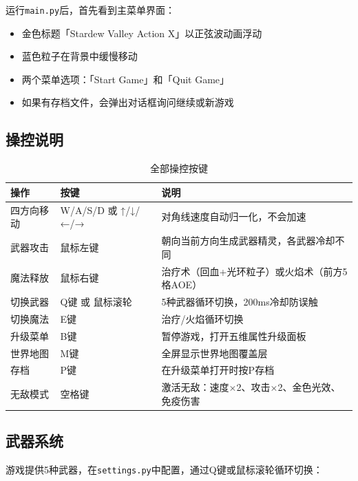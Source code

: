 \documentclass[12pt,a4paper]{ctexart}
\begin{document}
运行\texttt{main.py}后，首先看到主菜单界面：

\begin{itemize}
    \item 金色标题「Stardew Valley Action X」以正弦波动画浮动
    \item 蓝色粒子在背景中缓慢移动
    \item 两个菜单选项：「Start Game」和「Quit Game」
    \item 如果有存档文件，会弹出对话框询问继续或新游戏
\end{itemize}

\subsection{操控说明}

\begin{table}[H]
\centering
\small
\begin{tabularx}{\textwidth}{>{\raggedright\arraybackslash}p{3cm}>{\raggedright\arraybackslash}p{3.5cm}>{\raggedright\arraybackslash}p{6cm}}
\toprule
\textbf{操作} & \textbf{按键} & \textbf{说明} \\
\midrule
四方向移动 & W/A/S/D 或 ↑/↓/←/→ & 对角线速度自动归一化，不会加速 \\
武器攻击 & 鼠标左键 & 朝向当前方向生成武器精灵，各武器冷却不同 \\
魔法释放 & 鼠标右键 & 治疗术（回血+光环粒子）或火焰术（前方5格AOE） \\
切换武器 & Q键 或 鼠标滚轮 & 5种武器循环切换，200ms冷却防误触 \\
切换魔法 & E键 & 治疗/火焰循环切换 \\
升级菜单 & B键 & 暂停游戏，打开五维属性升级面板 \\
世界地图 & M键 & 全屏显示世界地图覆盖层 \\
存档 & P键 & 在升级菜单打开时按P存档 \\
无敌模式 & 空格键 & 激活无敌：速度×2、攻击×2、金色光效、免疫伤害 \\
\bottomrule
\end{tabularx}
\caption{全部操控按键}
\end{table}

\subsection{武器系统}

游戏提供5种武器，在\texttt{settings.py}中配置，通过Q键或鼠标滚轮循环切换：
\end{document}
